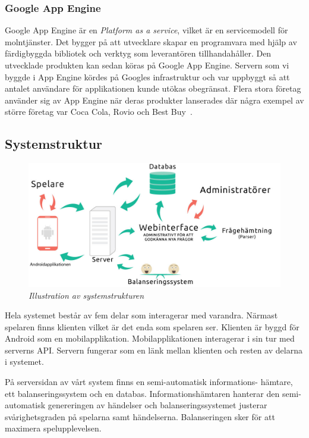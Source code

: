 \documentclass[a4paper, 11pt]{article}
\begin{document}
\subsubsection{Google App Engine} \label{Google App Engine}

Google App Engine är en \textit{Platform as a service}, vilket är en servicemodell för molntjänster. Det bygger på att utvecklare skapar en programvara med hjälp av färdigbyggda bibliotek och verktyg som leverantören tillhandahåller. Den utvecklade produkten kan sedan köras på Google App Engine. Servern som vi byggde i App Engine kördes på Googles infrastruktur och var uppbyggt så att antalet användare för applikationen kunde utökas obegränsat. Flera stora företag använder sig av App Engine när deras produkter lanserades där några exempel av större företag var Coca Cola, Rovio och Best Buy~\cite{googleappenginecustomers}. 

\subsection{Systemstruktur}

\begin{figure}[H]
	\begin{centering}
	\includegraphics[width = \textwidth]{systemstruktur2.jpg} 
	\end{centering}
	\caption{\textit{Illustration av systemstrukturen}}
\end{figure} 

Hela systemet består av fem delar som interagerar med varandra. Närmast spelaren finns klienten vilket är det enda som spelaren ser. Klienten är byggd för Android som en mobilapplikation. Mobilapplikationen interagerar i sin tur med serverns API. Servern fungerar som en länk mellan klienten och resten av delarna i systemet.

På serversidan av vårt system finns en semi-automatisk informations-
hämtare, ett balanseringssystem och en databas. Informationshämtaren hanterar den semi-automatisk genereringen av händelser och balanseringssystemet justerar svårighetsgraden på spelarna samt händelserna. Balanseringen sker för att maximera spelupplevelsen.
\end{document}

